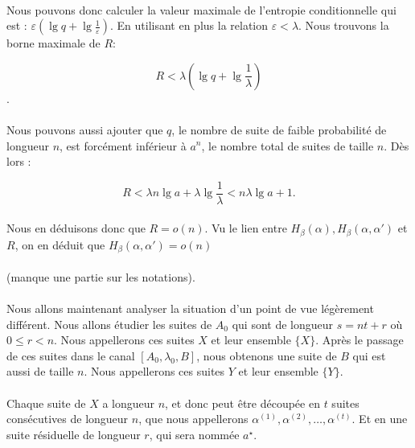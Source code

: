 	\paragraph{}
	Nous pouvons donc calculer la valeur maximale de l'entropie conditionnelle
	qui est : $\varepsilon \left(\lg q+\lg\frac{1}{\varepsilon}\right)$.
	En utilisant en plus la relation $\varepsilon < \lambda$. Nous trouvons la
	borne maximale de $R$:
	
	\[R<\lambda\left(\lg q+\lg\frac{1}{\lambda}\right)\].
	
	\paragraph{}
	Nous pouvons aussi ajouter que $q$, le nombre de suite de faible 
	probabilité de longueur $n$, est forcément inférieur à $a^n$, le 
	nombre total de suites de taille $n$.
	Dès lors :
	
	\[R<\lambda n\lg a +\lambda \lg \frac{1}{\lambda}<n\lambda\lg a+1.\]
	
	\paragraph{}
	Nous en déduisons donc que $R=o(n)$. Vu le lien entre 
	$H_\beta(\alpha),H_\beta(\alpha,\alpha')$ et $R$, 
	on en déduit que $H_\beta(\alpha,\alpha')=o(n)$
	
	\paragraph{}
	(manque une partie sur les notations).
	
	\paragraph{}
	Nous allons maintenant analyser la situation d'un point de vue 
	légèrement différent. Nous allons étudier les suites de $A_0$ qui sont
	de longueur $s = nt+r$ où $0\le r < n$. Nous appellerons ces suites 
	$X$ et leur ensemble $\{X\}$. Après le passage de ces suites dans le 
	canal $[A_0,\lambda_0,B]$, nous obtenons une suite de $B$ qui est aussi
	de taille $n$. Nous appellerons ces suites $Y$ et 
	leur ensemble $\{Y\}$.
	
	\paragraph{}
	Chaque suite de $X$ a longueur $n$, et donc peut être découpée en 
	$t$ suites consécutives de longueur $n$, que nous appellerons 
	$\alpha^{(1)}, \alpha^{(2)}, \dots, \alpha^{(t)}$.
	Et en une suite résiduelle de longueur $r$, qui sera nommée $a^\star$.
	
